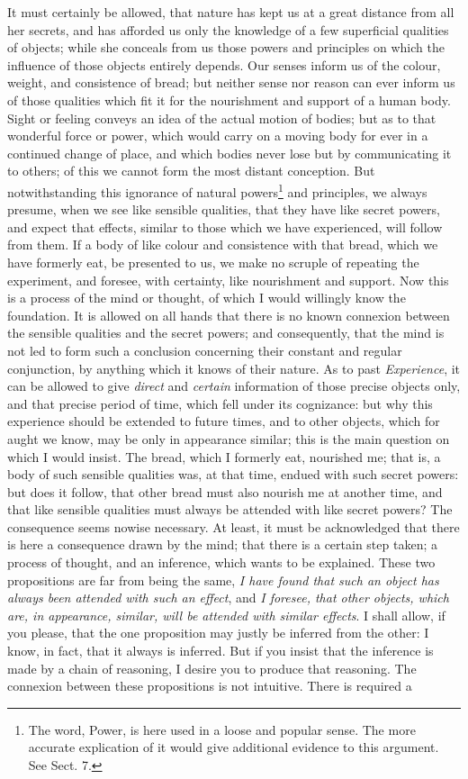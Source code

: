 \documentclass[]{article}
\newcounter{authornote}[page]
\newcommand*{\authornote}[1]{\renewcommand{\thefootnote}{\fnsymbol{footnote}}\stepcounter{authornote}\footnote[\value{authornote}]{#1}\renewcommand{\thefootnote}{\arabic{footnote}}}
\begin{document}
\begin{sectionbody}
\humeparagraph  It must certainly be allowed, that nature has kept us at a great distance from all her secrets, and has afforded us only the knowledge of a few superficial qualities of objects; while she conceals from us those powers and principles on which the influence of those objects entirely depends. Our senses inform us of the colour, weight, and consistence of bread; but neither sense nor reason can ever inform us of those qualities which fit it for the nourishment and support of a human body. Sight or feeling conveys an idea of the actual motion of bodies; but as to that wonderful force or power, which would carry on a moving body for ever in a continued change of place, and which bodies never lose but by communicating it to others; of this we cannot form the most distant conception. But notwithstanding this ignorance of natural powers\authornote{The word, Power, is here used in a loose and popular sense. The more accurate explication of it would give additional evidence to this argument. See Sect. 7.} and principles, we always presume, when we see like sensible qualities, that they have like secret powers, and expect that effects, similar to those which we have experienced, will follow from them. If a body of like colour and consistence with that bread, which we have formerly eat, be presented to us, we make no scruple of repeating the experiment, and foresee, with certainty, like nourishment and support. Now this is a process of the mind or thought, of which I would willingly know the foundation. It is allowed on all hands that there is no known connexion between the sensible qualities and the secret powers; and consequently, that the mind is not led to form such a conclusion concerning their constant and regular conjunction, by anything which it knows of their nature. As to past \emph{Experience}, it can be allowed to give \emph{direct} and \emph{certain} information of those precise objects only, and that precise period of time, which fell under its cognizance: but why this experience should be extended to future times, and to other objects, which for aught we know, may be only in appearance similar; this is the main question on which I would insist. The bread, which I formerly eat, nourished me; that is, a body of such sensible qualities was, at that time, endued with such secret powers: but does it follow, that other bread must also nourish me at another time, and that like sensible qualities must always be attended with like secret powers? The consequence seems nowise necessary. At least, it must be acknowledged that there is here a consequence drawn by the mind; that there is a certain step taken; a process of thought, and an inference, which wants to be explained. These two propositions are far from being the same, \emph{I have found that such an object has always been attended with such an effect}, and \emph{I foresee, that other objects, which are, in appearance, similar, will be attended with similar effects}. I shall allow, if you please, that the one proposition may justly be inferred from the other: I know, in fact, that it always is inferred. But if you insist that the inference is made by a chain of reasoning, I desire you to produce that reasoning. The connexion between these propositions is not intuitive. There is required a 
\end{sectionbody}
\end{document}
